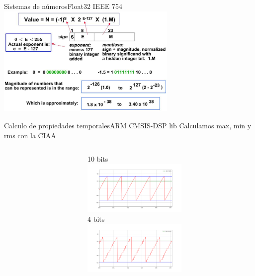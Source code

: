  \begin{frame}[t]{Sistemas de números}{Float32 IEEE 754}
       \center\includegraphics[width=0.65\textwidth]{2_clase/float32_example}
    \vfill
 \end{frame}
 \begin{frame}[t]{Calculo de propiedades temporales}{ARM CMSIS-DSP lib}
    \protoboardicon
    \footnotesize{Calculamos max, min y rms con la CIAA}
       \begin{columns}[t]
          \begin{column}[t]{.5\textwidth}
             
          \end{column}
          \begin{column}[t]{.5\textwidth}
                \tiny{10 bits}\\
                   \includegraphics[width=5cm]{2_clase/max_min_rms_10b.png}\\
                \tiny{4 bits}\\
                   \includegraphics[width=5cm]{2_clase/max_min_rms_4b.png} \\
          \end{column}
       \end{columns}
 \end{frame}
